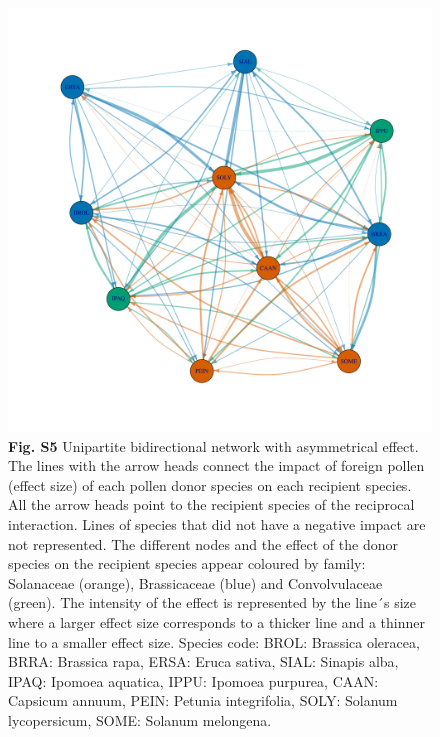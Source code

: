 \documentclass[
  12pt,
]{article}
\begin{document}
\begin{figure}
\centering
\includegraphics{Supp_Material_files/figure-latex/unnamed-chunk-8-1.pdf}
\caption{\textbf{Fig. S5} Unipartite bidirectional network with
asymmetrical effect. The lines with the arrow heads connect the impact
of foreign pollen (effect size) of each pollen donor species on each
recipient species. All the arrow heads point to the recipient species of
the reciprocal interaction. Lines of species that did not have a
negative impact are not represented. The different nodes and the effect
of the donor species on the recipient species appear coloured by family:
Solanaceae (orange), Brassicaceae (blue) and Convolvulaceae (green). The
intensity of the effect is represented by the line´s size where a larger
effect size corresponds to a thicker line and a thinner line to a
smaller effect size. Species code: BROL: Brassica oleracea, BRRA:
Brassica rapa, ERSA: Eruca sativa, SIAL: Sinapis alba, IPAQ: Ipomoea
aquatica, IPPU: Ipomoea purpurea, CAAN: Capsicum annuum, PEIN: Petunia
integrifolia, SOLY: Solanum lycopersicum, SOME: Solanum melongena.}
\end{figure}

\clearpage
\end{document}
